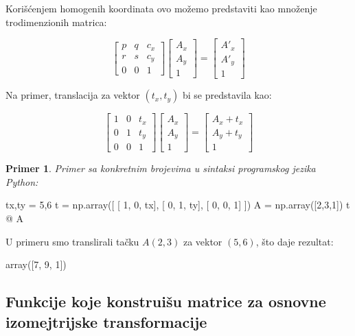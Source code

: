 \documentclass[11pt]{article}
\newtheorem{pri}{\bf Primer}
\begin{document}
Korišćenjem homogenih koordinata ovo možemo predstaviti kao množenje
trodimenzionih matrica:

\[\begin{bmatrix}p & q & c_x\\ r & s&c_y \\ 0 & 0 & 1\end{bmatrix} \begin{bmatrix}A_x\\ A_y\\1\end{bmatrix} = 
\begin{bmatrix}A'_x\\ A'_y\\1\end{bmatrix}\]

Na primer, translacija za vektor \((t_x, t_y)\) bi se predstavila kao:

\[\begin{bmatrix}1 & 0 & t_x\\ 0 & 1&t_y \\ 0 & 0 & 1\end{bmatrix} \begin{bmatrix}A_x\\ A_y\\1\end{bmatrix} = 
\begin{bmatrix}A_x+t_x\\ A_y+t_y\\1\end{bmatrix}\]

\begin{pri}Primer sa konkretnim brojevima u sintaksi programskog jezika Python:
\end{pri}  

\begin{python}
tx,ty = 5,6
t = np.array([
    [ 1,  0,  tx],
    [ 0,  1,  ty],
    [ 0,  0,  1] ])
A = np.array([2,3,1])
t @ A
\end{python} 

    U primeru smo translirali tačku \(A(2,3)\) za vektor \((5,6)\), što daje rezultat:
    
\begin{python}
array([7, 9, 1])
\end{python}

    \subsection{Funkcije koje konstruišu matrice za osnovne izomejtrijske
transformacije}\label{funkcije-koje-konstruiux161u-matrice-za-osnovne-izomejtrijske-transformacije}
\end{document}
